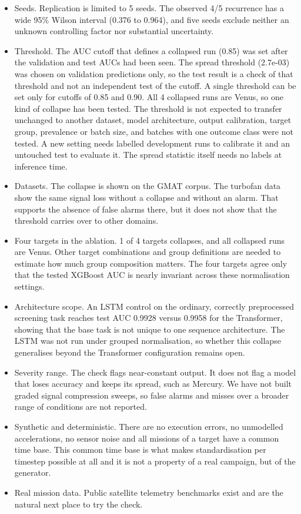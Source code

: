 \documentclass[preprint,12pt,authoryear,doubleblind]{elsarticle}
\begin{document}
\begin{itemize}
\item Seeds. Replication is limited to 5 seeds. The observed 4/5 recurrence has a wide 95\% Wilson interval (0.376 to 0.964), and five seeds exclude neither an unknown controlling factor nor substantial uncertainty.
\item Threshold. The AUC cutoff that defines a collapsed run (0.85) was set after the validation and test AUCs had been seen. The spread threshold (2.7e-03) was chosen on validation predictions only, so the test result is a check of that threshold and not an independent test of the cutoff. A single threshold can be set only for cutoffs of 0.85 and 0.90. All 4 collapsed runs are Venus, so one kind of collapse has been tested. The threshold is not expected to transfer unchanged to another dataset, model architecture, output calibration, target group, prevalence or batch size, and batches with one outcome class were not tested. A new setting needs labelled development runs to calibrate it and an untouched test to evaluate it. The spread statistic itself needs no labels at inference time.
\item Datasets. The collapse is shown on the GMAT corpus. The turbofan data show the same signal loss without a collapse and without an alarm. That supports the absence of false alarms there, but it does not show that the threshold carries over to other domains.
\item Four targets in the ablation. 1 of 4 targets collapses, and all collapsed runs are Venus. Other target combinations and group definitions are needed to estimate how much group composition matters. The four targets agree only that the tested XGBoost AUC is nearly invariant across these normalisation settings.
\item Architecture scope. An LSTM control on the ordinary, correctly preprocessed screening task reaches test AUC 0.9928 versus 0.9958 for the Transformer, showing that the base task is not unique to one sequence architecture. The LSTM was not run under grouped normalisation, so whether this collapse generalises beyond the Transformer configuration remains open.
\item Severity range. The check flags near-constant output. It does not flag a model that loses accuracy and keeps its spread, such as Mercury. We have not built graded signal compression sweeps, so false alarms and misses over a broader range of conditions are not reported.
\item Synthetic and deterministic. There are no execution errors, no unmodelled accelerations, no sensor noise and all missions of a target have a common time base. This common time base is what makes standardisation per timestep possible at all and it is not a property of a real campaign, but of the generator.
\item Real mission data. Public satellite telemetry benchmarks exist \citep{kotowski2024,hundman2018} and are the natural next place to try the check.
\end{itemize}
\end{document}
